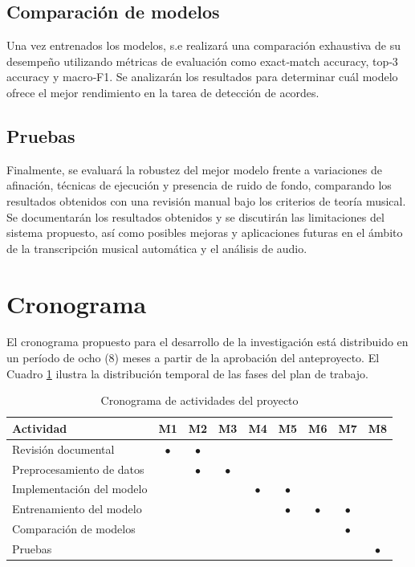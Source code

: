 \subsection{Comparación de modelos}

Una vez entrenados los modelos, s.e realizará una comparación exhaustiva de su desempeño utilizando métricas de evaluación como exact‑match accuracy, top‑3 accuracy y macro‑F1. Se analizarán los resultados para determinar cuál modelo ofrece el mejor rendimiento en la tarea de detección de acordes.

\subsection{Pruebas}

Finalmente, se evaluará la robustez del mejor modelo frente a variaciones de afinación, técnicas de ejecución y presencia de ruido de fondo, comparando los resultados obtenidos con una revisión manual bajo los criterios de teoría musical. Se documentarán los resultados obtenidos y se discutirán las limitaciones del sistema propuesto, así como posibles mejoras y aplicaciones futuras en el ámbito de la transcripción musical automática y el análisis de audio.

\newpage

\section{Cronograma}

El cronograma propuesto para el desarrollo de la investigación está distribuido en un período de ocho (8) meses a partir de la aprobación del anteproyecto. El Cuadro \ref{tab:cronograma} ilustra la distribución temporal de las fases del plan de trabajo.

\begin{table}[H]
\centering
\caption{Cronograma de actividades del proyecto}
\label{tab:cronograma}
\begin{tabular}{|l|c|c|c|c|c|c|c|c|}
\hline
\textbf{Actividad} & \textbf{M1} & \textbf{M2} & \textbf{M3} & \textbf{M4} & \textbf{M5} & \textbf{M6} & \textbf{M7} & \textbf{M8} \\
\hline
Revisión documental & $\bullet$ & $\bullet$ & & & & & & \\
\hline
Preprocesamiento de datos & & $\bullet$ & $\bullet$ & & & & & \\
\hline
Implementación del modelo & & & & $\bullet$ & $\bullet$ & & & \\
\hline
Entrenamiento del modelo & & & & & $\bullet$ & $\bullet$ & $\bullet$ & \\
\hline
Comparación de modelos & & & & & & & $\bullet$ & \\
\hline
Pruebas & & & & & & & & $\bullet$ \\
\hline
\end{tabular}
\end{table}

